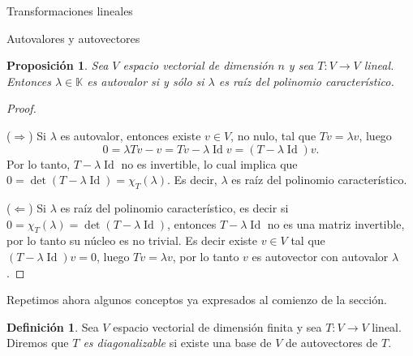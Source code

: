\documentclass[a4paper,12pt,twoside,spanish,reqno]{amsbook}
\newtheorem{proposicion}[teorema]{Proposici\'on}
\theoremstyle{definition}
\newtheorem{definicion}{Definici\'on}[section]
\newtheorem{ejemplo}{Ejemplo}[section]
\theoremstyle{remark}
\newcommand{\Id}{\operatorname{Id}}
\newcommand{\K}{\mathbb K}
\begin{document}
\begin{chapter}{Transformaciones lineales}
\begin{section}{Autovalores y autovectores}
	\begin{comment}
		\begin{ejemplo}
		Sea
		$$ 
		A=\begin{bmatrix}1&2&1\\ 6&-1&0\\ -1&-2&-1\end{bmatrix},
		$$
		entonces el  polinomio característico de $A$ es
		$$
		\det \begin{bmatrix}1-x&2&1\\ 6&-1-x&0\\ -1&-2&-1-x\end{bmatrix} = -x^3 - x^2 + 12 x.
		$$
		Es posible factorizar esta expresión y obtenemos
		$$
		\chi_A(x) = -x(x-3)(x+4).
		$$
		\end{ejemplo}
	\end{comment}	
		
	

		
		\begin{proposicion}\label{autovalores}
			Sea $V$ espacio vectorial de dimensión $n$ y sea $T: V \to V$ lineal. Entonces $\lambda\in \K$ es autovalor si y sólo si $\lambda$ es raíz del polinomio característico.  
		\end{proposicion}
		\begin{proof}${}^{}$
			
			($\Rightarrow$) Si $\lambda$ es autovalor, entonces existe $v \in V$, no nulo, tal que $Tv = \lambda v$, luego 
			$$
			0 = \lambda Tv -v  =   Tv - \lambda \Id v =  (T-\lambda \Id)v.
			$$
			Por lo tanto, $T-\lambda \Id$ no es invertible, lo cual implica que $0 = \det(T-\lambda \Id) = \chi_T(\lambda)$. Es decir, $\lambda$ es raíz del polinomio característico. 
			
			($\Leftarrow$) Si $\lambda$ es raíz del polinomio característico, es decir si $0 = \chi_T(\lambda) = \det(T-\lambda \Id)$, entonces $T-\lambda \Id$ no es una matriz invertible, por lo tanto  su núcleo es no trivial. Es decir existe $v \in V$ tal que $(T-\lambda \Id)v =0$, luego $Tv =\lambda v$, por lo tanto $v$ es autovector con autovalor $\lambda$.   
		\end{proof}
		
		Repetimos ahora algunos conceptos ya expresados al comienzo de la sección. 
		
		\begin{definicion}
			Sea $V$ espacio vectorial de dimensión finita y sea $T: V \to V$ lineal. Diremos que \textit{$T$ es diagonalizable} si existe una base de $V$ de autovectores de $T$. 
		\end{definicion}	
		

\end{section}
\end{chapter}
\end{document}
